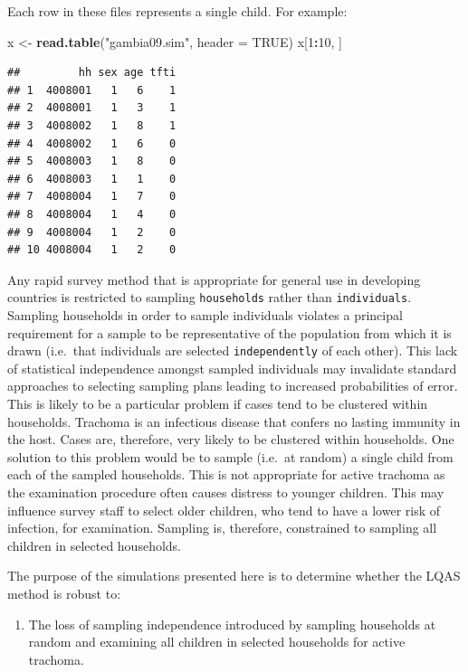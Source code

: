 \documentclass[12pt,a4paper]{book}
\newenvironment{Shaded}{\begin{snugshade}}{\end{snugshade}}
\newcommand{\DataTypeTok}[1]{\textcolor[rgb]{0.13,0.29,0.53}{#1}}
\newcommand{\DecValTok}[1]{\textcolor[rgb]{0.00,0.00,0.81}{#1}}
\newcommand{\KeywordTok}[1]{\textcolor[rgb]{0.13,0.29,0.53}{\textbf{#1}}}
\newcommand{\NormalTok}[1]{#1}
\newcommand{\OperatorTok}[1]{\textcolor[rgb]{0.81,0.36,0.00}{\textbf{#1}}}
\newcommand{\OtherTok}[1]{\textcolor[rgb]{0.56,0.35,0.01}{#1}}
\newcommand{\StringTok}[1]{\textcolor[rgb]{0.31,0.60,0.02}{#1}}
\providecommand{\tightlist}{%
  \setlength{\itemsep}{0pt}\setlength{\parskip}{0pt}}
\theoremstyle{definition}
\theoremstyle{definition}
\theoremstyle{definition}
\theoremstyle{remark}
\begin{document}
Each row in these files represents a single child. For example:

\begin{Shaded}
\begin{Highlighting}[]
\NormalTok{x <-}\StringTok{ }\KeywordTok{read.table}\NormalTok{(}\StringTok{"gambia09.sim"}\NormalTok{, }\DataTypeTok{header =} \OtherTok{TRUE}\NormalTok{)}
\NormalTok{x[}\DecValTok{1}\OperatorTok{:}\DecValTok{10}\NormalTok{, ]}
\end{Highlighting}
\end{Shaded}

\begin{verbatim}
##         hh sex age tfti
## 1  4008001   1   6    1
## 2  4008001   1   3    1
## 3  4008002   1   8    1
## 4  4008002   1   6    0
## 5  4008003   1   8    0
## 6  4008003   1   1    0
## 7  4008004   1   7    0
## 8  4008004   1   4    0
## 9  4008004   1   2    0
## 10 4008004   1   2    0
\end{verbatim}

Any rapid survey method that is appropriate for general use in
developing countries is restricted to sampling \texttt{households}
rather than \texttt{individuals}. Sampling households in order to sample
individuals violates a principal requirement for a sample to be
representative of the population from which it is drawn (i.e.~that
individuals are selected \texttt{independently} of each other). This
lack of statistical independence amongst sampled individuals may
invalidate standard approaches to selecting sampling plans leading to
increased probabilities of error. This is likely to be a particular
problem if cases tend to be clustered within households. Trachoma is an
infectious disease that confers no lasting immunity in the host. Cases
are, therefore, very likely to be clustered within households. One
solution to this problem would be to sample (i.e.~at random) a single
child from each of the sampled households. This is not appropriate for
active trachoma as the examination procedure often causes distress to
younger children. This may influence survey staff to select older
children, who tend to have a lower risk of infection, for examination.
Sampling is, therefore, constrained to sampling all children in selected
households.

The purpose of the simulations presented here is to determine whether
the LQAS method is robust to:

\begin{enumerate}
\def\labelenumi{\arabic{enumi}.}
\tightlist
\item
  The loss of sampling independence introduced by sampling households at
  random and examining all children in selected households for active
  trachoma.
\end{enumerate}
\end{document}
